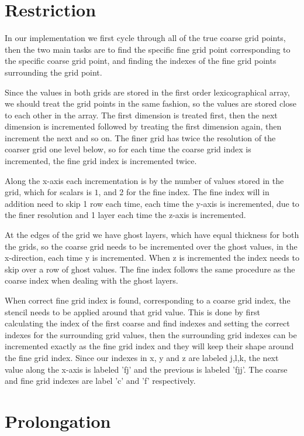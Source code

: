 


\section{Restriction}
	In our implementation we first cycle through all of the true coarse grid points, then
	the two main tasks are to find the specific fine grid point corresponding to the specific
 	coarse grid point, and finding the indexes of the fine grid points surrounding the grid point.

	Since the values in both grids are stored in the first order lexicographical array, we should treat the
	grid points in the same fashion, so the values are stored close to each other in the array.
	The first dimension is treated first, then the next dimension is incremented followed by
	treating the first dimension again, then increment the next and so on. The finer grid has twice the
	resolution of the coarser grid one level below, so for each time the coarse grid index is incremented,
	the fine grid index is incremented twice.

	Along the x-axis each incrementation is by the number of values stored in the grid, which for scalars
	is \(1\), and 2 for the fine index. The fine index will in addition
	need to skip 1 row each time, each time the y-axis is incremented, due to the finer resolution and 1 layer each time
	the z-axis is incremented.

	At the edges of the grid we have ghost layers, which have equal thickness for both the grids, so the
	coarse grid needs to be incremented over the ghost values, in the x-direction, each time y is incremented.
	When z is incremented the index needs to skip over a row of ghost values. The fine index follows
	the same procedure as the coarse index when dealing with the ghost layers.

	When correct fine grid index is found, corresponding to a coarse grid index, the stencil needs to be applied around
 	that grid value. This is done by first calculating the index of the first coarse and find indexes and setting
	the correct indexes for the surrounding grid values, then the surrounding grid indexes can be incremented
	exactly as the fine grid index and they will keep their shape around the fine grid index. Since our indexes
	in x, y and z are labeled j,l,k, the next value along the x-axis is labeled 'fj' and the previous is labeled
	'fjj'. The coarse and fine grid indexes are label 'c' and 'f' respectively.


\section{Prolongation}


